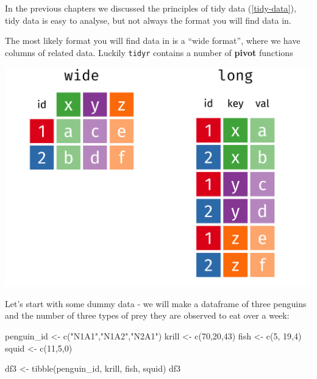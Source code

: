 \documentclass[
]{book}
\newenvironment{Shaded}{\begin{snugshade}}{\end{snugshade}}
\newcommand{\DecValTok}[1]{\textcolor[rgb]{0.00,0.00,0.81}{#1}}
\newcommand{\FunctionTok}[1]{\textcolor[rgb]{0.00,0.00,0.00}{#1}}
\newcommand{\NormalTok}[1]{#1}
\newcommand{\OtherTok}[1]{\textcolor[rgb]{0.56,0.35,0.01}{#1}}
\newcommand{\StringTok}[1]{\textcolor[rgb]{0.31,0.60,0.02}{#1}}
\begin{document}
In the previous chapters we discussed the principles of tidy data (\ref{tidy-data}), tidy data is easy to analyse, but not always the format you will find data in.

The most likely format you will find data in is a ``wide format'', where we have columns of related data. Luckily \texttt{tidyr} contains a number of \textbf{pivot} functions

\includegraphics[width=29.15in]{images/original-dfs-tidy}

Let's start with some dummy data - we will make a dataframe of three penguins and the number of three types of prey they are observed to eat over a week:

\begin{Shaded}
\begin{Highlighting}[]
\NormalTok{penguin\_id }\OtherTok{\textless{}{-}} \FunctionTok{c}\NormalTok{(}\StringTok{"N1A1"}\NormalTok{,}\StringTok{"N1A2"}\NormalTok{,}\StringTok{"N2A1"}\NormalTok{)}
\NormalTok{krill }\OtherTok{\textless{}{-}} \FunctionTok{c}\NormalTok{(}\DecValTok{70}\NormalTok{,}\DecValTok{20}\NormalTok{,}\DecValTok{43}\NormalTok{)}
\NormalTok{fish }\OtherTok{\textless{}{-}} \FunctionTok{c}\NormalTok{(}\DecValTok{5}\NormalTok{, }\DecValTok{19}\NormalTok{,}\DecValTok{4}\NormalTok{)}
\NormalTok{squid }\OtherTok{\textless{}{-}} \FunctionTok{c}\NormalTok{(}\DecValTok{11}\NormalTok{,}\DecValTok{5}\NormalTok{,}\DecValTok{0}\NormalTok{)}


\NormalTok{df3 }\OtherTok{\textless{}{-}} \FunctionTok{tibble}\NormalTok{(penguin\_id, krill, fish, squid)}
\NormalTok{df3}
\end{Highlighting}
\end{Shaded}
\end{document}
